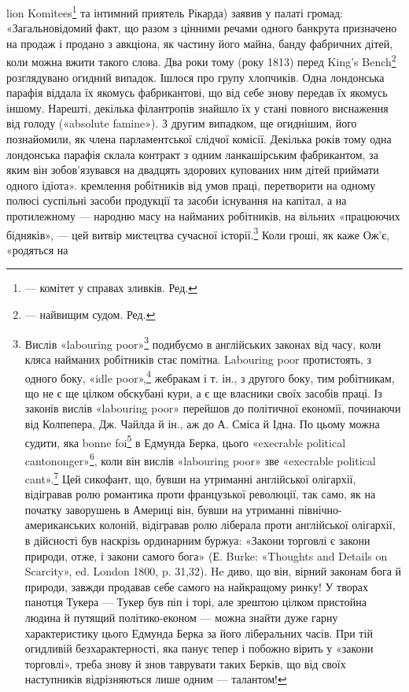 lion Komitees\footnote*{
— комітет у справах зливків. Ред.
} та інтимний приятель Рікарда) заявив у палаті громад:
«Загальновідомий факт, що разом з цінними речами одного банкрута
призначено на продаж і продано з авкціона, як частину його майна, банду
фабричних дітей, коли можна вжити такого слова. Два роки тому (року
1813) перед King’s Bench\footnote*{
— найвищим судом. Ред.
} розглядувано огидний випадок. Ішлося про
групу хлопчиків. Одна лондонська парафія віддала їх якомусь фабрикантові,
що від себе знову передав їх якомусь іншому. Нарешті, декілька філантропів
знайшло їх у стані повного виснаження від голоду («absolute
famine»). З другим випадком, ще огиднішим, його познайомили, як члена
парламентської слідчої комісії. Декілька років тому одна лондонська
парафія склала контракт з одним ланкашірським фабрикантом, за яким
він зобов’язувався на двадцять здорових купованих ним дітей приймати
одного ідіота».
кремлення робітників від умов праці, перетворити на одному
полюсі суспільні засоби продукції та засоби існування на капітал,
а на протилежному — народню масу на найманих робітників,
на вільних «працюючих бідняків», — цей витвір мистецтва
сучасної історії.\footnote{
Вислів «labouring poor»\footnote*{
— працюючі бідняки. Peд.
} подибуємо в англійських законах від
часу, коли кляса найманих робітників стає помітна. Labouring poor протистоять,
з одного боку, «idle poor»,\footnote*{
— біднякам-неробам. Peд.
} жебракам і т. ін., з другого боку,
тим робітникам, що не є ще цілком обскубані кури, а є ще власники
своїх засобів праці. Із законів вислів «labouring poor» перейшов
до політичної економії, починаючи від Колпепера, Дж. Чайлда й ін.,
аж до А. Сміса й Ідна. По цьому можна судити, яка bonne foi\footnote*{
— сумлінність. Peд.
} в Едмунда
Берка, цього «execrable political cantononger»\footnote*{
— огидливого політичного крамаря. Peд.
}, коли він вислів
«labouring poor» зве «execrable political cant».\footnote*{
— огидливим політичним перекрученням. Ред.
} Цей сикофант, що,
бувши на утриманні англійської олігархії, відігравав ролю романтика проти
французької революції, так само, як на початку заворушень в Америці
він, бувши на утриманні північно-американських колоній, відігравав
ролю ліберала проти англійської олігархії, в дійсності був наскрізь ординарним
буржуа: «Закони торговлі є закони природи, отже, і закони самого
бога» (Е. Burke: «Thoughts and Details on Scarcity», ed. London
1800, p. 31,32). He диво, що він, вірний законам бога й природи, завжди
продавав себе самого на найкращому ринку! У творах панотця Тукера —
Тукер був піп і торі, але зрештою цілком пристойна людина й путящий
політико-економ — можна знайти дуже гарну характеристику цього
Едмунда Берка за його ліберальних часів. При тій огидливій безхарактерності,
яка панує тепер і побожно вірить у «закони торговлі», треба
знову й знов таврувати таких Берків, що від своїх наступників відрізняються
лише одним — талантом!
} Коли гроші, як каже Ож’є, «родяться на
